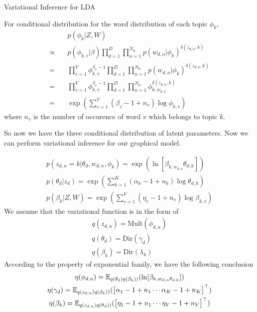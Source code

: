 \begin{frame}[allowframebreaks]{Variational Inference for LDA}
    \framebreak
    
    For conditional distribution for the word distribution of each topic $\phi_k$,
    \begin{align*}
    & p(\phi_k | Z, W) \\
    \propto \quad &  p(\phi_{k,v} | \beta) \prod_{d=1}^D\prod_{n=1}^{N_d} p(w_{d,n} | \phi_k)^{\delta(z_{d,n}, k)}\\
    = \quad & \prod_{v=1}^V \phi_{k,v}^{\beta_v - 1}\prod_{d=1}^D\prod_{n=1}^{N_d} p(w_{d,n} | \phi_k)^{\delta(z_{d,n}, k)} \\
    = \quad & \prod_{v=1}^V \phi_{k,v}^{\beta_v - 1}\prod_{d=1}^D\prod_{n=1}^{N_d} \phi_{k, w_{d,n}}^{\delta(z_{d,n}, k)} \\
    = \quad & \exp (\sum_{v=1}^V (\beta_v - 1 +  n_v) \log \phi_{k,v}) 
    \end{align*}
    where $n_v$ is the number of occurence of word $v$ which belongs to topic $k$.
    
    So now we have the three conditional distribution of latent parameters. Now we can perform variational inference for our graphical model.
    
    \begin{gather*}
    p(z_{d,n} = k | \theta_d, w_{d,n}, \phi_k)  =  \exp (\ln [\beta_{k, w_{d,n}}\theta_{d,k}])\\
    p(\theta_d | z_d)  = \exp (\sum_{k=1}^K (\alpha_k - 1 + n_k) \log \theta_{d,k}) \\
    p(\beta_k | Z, W)  = \exp (\sum_{v=1}^V (\eta_v - 1 +  n_v) \log \beta_{k,v}) 
    \end{gather*}
    We assume that the variational function is in the form of 
    \begin{gather*}
    q(z_{d,n})=\text{Mult}(\phi_{d,n})\\
    q(\theta_d)=\text{Dir}(\gamma_d)\\
    q(\beta_k) = \text{Dir}(\lambda_k)
    \end{gather*}
    According to the property of exponential family, we have the following conclusion
    \begin{gather*}
    \eta(\phi_{d,n}) = \mathbb{E}_{q(\theta_d) q(\beta_k))}(\ln [\beta_{k, w_{d,n}\theta_{d,k}}])\\
    \eta(\gamma_d) = \mathbb{E}_{q(z_{d,n}) q(\beta_k))}(\begin{bmatrix}\alpha_1 - 1 + n_1 \cdots \alpha_K - 1 + n_K\end{bmatrix}^\top)\\
    \eta(\beta_k) = \mathbb{E}_{q(z_{d,n}) q(\theta_d))}(\begin{bmatrix}\eta_1 - 1 + n_1 \cdots \eta_V - 1 + n_V\end{bmatrix}^\top)
    \end{gather*}
    

\end{frame}
